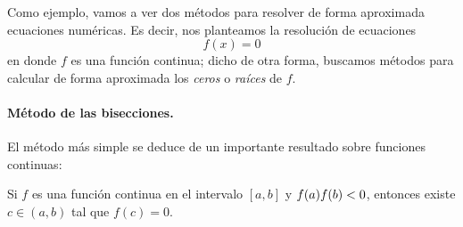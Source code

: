 %

Como ejemplo,  vamos a ver dos métodos para resolver de forma aproximada ecuaciones numéricas.
Es decir, nos planteamos la resolución de ecuaciones
\[
f(x)=0
\]
en donde $f$ es una función continua; dicho de otra forma, buscamos métodos para calcular de forma aproximada los \emph{ceros} o \emph{raíces} de $f$.

\paragraph{Método de las bisecciones.}
El método más simple se deduce de un importante resultado sobre funciones continuas:

\begin{teorema}[de Bolzano]
Si $f$ es una función continua en el intervalo $[a,b]$ y
$f(a)f(b)< 0$, entonces existe $c\in(a,b)$ tal que $f(c)=0$.
\end{teorema}

